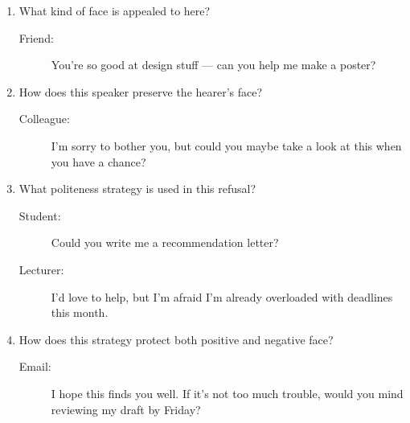 \documentclass[a4paper]{article}
\begin{document}
\begin{enumerate}
\begin{enumerate}
\item What kind of face is appealed to here?
  \begin{description}
    \item[Friend:] You’re so good at design stuff — can you help me make a poster?
  \end{description}

\item How does this speaker preserve the hearer’s face?
  \begin{description}
    \item[Colleague:] I’m sorry to bother you, but could you maybe take a look at this when you have a chance?
  \end{description}


\item What politeness strategy is used in this refusal?
  \begin{description}
    \item[Student:] Could you write me a recommendation letter?
    \item[Lecturer:] I’d love to help, but I’m afraid I’m already overloaded with deadlines this month.
  \end{description}


\item How does this strategy protect both positive and negative face?
  \begin{description}
    \item[Email:] I hope this finds you well. If it's not too much trouble, would you mind reviewing my draft by Friday?
  \end{description}

\end{enumerate}
\newpage


\end{enumerate}
\end{document}
